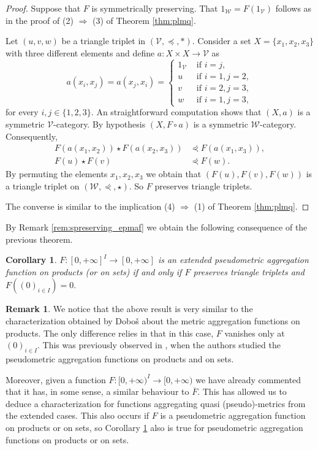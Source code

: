 \documentclass[11pt,a4paper]{amsart}
\newtheorem{corollary}[theorem]{Corollary}
\theoremstyle{definition}
\newtheorem{remark}[theorem]{Remark}
\begin{document}
	\begin{proof}
		Suppose that $F$ is symmetrically preserving. That $1_\mathscr{W}= F(1_\mathscr{V})$ follows as in the proof of (2) $\Rightarrow$ (3) of Theorem \ref{thm:plmq}.
		
		Let $(u,v,w)$ be a triangle triplet in  $(\mathscr{V},\preceq,\ast)$.  Consider a set $X=\{x_1,x_2,x_3\}$ with three different elements and define $a:X\times X\to\mathscr{V}$ as
		$$a(x_i,x_j)=a(x_j,x_i)=\begin{cases}
			1_\mathscr{V}&\text{ if }i=j,\\
			u&\text{ if }i=1, j=2,\\
			v&\text{ if }i=2, j=3 ,\\
			w&\text{ if }i=1, j=3,
		\end{cases}$$
		for every $i,j\in\{1,2,3\}.$
		An straightforward computation shows that $(X,a)$ is a symmetric $\mathscr{V}$-category. By hypothesis $(X,F\circ a)$ is a symmetric $\mathscr{W}$-category. Consequently,
		\begin{align*}
			F(a(x_1,x_2))\star F(a(x_2,x_3))&\curlyeqprec F(a(x_1,x_3)),\\
			F(u)\star F(v)&\curlyeqprec F(w).
		\end{align*}
		By permuting the elements $x_1,x_2,x_3$ we obtain that $(F(u),F(v),F(w))$ is a triangle triplet on $(\mathscr{W},\curlyeqprec,\star)$. So $F$ preserves triangle triplets.
		
		The converse is similar to the implication (4) $\Rightarrow$ (1) of Theorem \ref{thm:plmq}.
	\end{proof}
	
	By Remark \ref{rem:spreserving_epmaf} we obtain the following consequence of the previous theorem.
	
	\begin{corollary}\label{cor:epmaf}
		$F:[0,+\infty]^I\to[0,+\infty]$ is an extended pseudometric aggregation function on products (or on sets) if and only if $F$ preserves triangle triplets and $F((0)_{i\in I})=0.$ 
	\end{corollary}
	
	\begin{remark}
		We notice that the above result is very similar to the characterization obtained by Dobo\v{s} \cite{Dobos98} about the metric aggregation functions on products. The only difference relies in that in this case, $F$ vanishes only at $(0)_{i\in I}$. This was previously observed in \cite{PraTri02}, when the authors studied the pseudometric aggregation functions on products and on sets.
		
		Moreover, given a function $F:[0,+\infty)^I\to [0,+\infty)$ we have already commented that it has, in some sense, a similar behaviour to $\overline{F}.$ This has allowed us to deduce a characterization for functions aggregating quasi (pseudo)-metrics from the extended cases. This also occurs if $F$ is a pseudometric aggregation function on products or on sets, so Corollary \ref{cor:epmaf} also is true for pseudometric aggregation functions on products or on sets.
	\end{remark}
	
\end{document}
